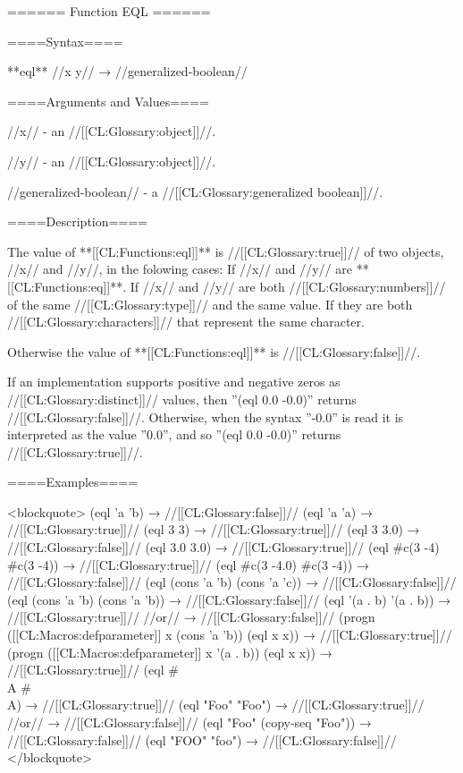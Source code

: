 ====== Function EQL ======

====Syntax====

**eql** //x y// → //generalized-boolean//

====Arguments and Values====

//x// - an //[[CL:Glossary:object]]//.

//y// - an //[[CL:Glossary:object]]//.

//generalized-boolean// - a //[[CL:Glossary:generalized boolean]]//.

====Description====

The value of **[[CL:Functions:eql]]** is //[[CL:Glossary:true]]// of two objects, //x// and //y//, in the folowing cases: \beginlist {} If //x// and //y// are **[[CL:Functions:eq]]**.  If //x// and //y// are both //[[CL:Glossary:numbers]]// of the same //[[CL:Glossary:type]]// and the same value.  If they are both //[[CL:Glossary:characters]]// that represent the same character. \endlist

Otherwise the value of **[[CL:Functions:eql]]** is //[[CL:Glossary:false]]//.

If an implementation supports positive and negative zeros as //[[CL:Glossary:distinct]]// values, then ''(eql 0.0 -0.0)'' returns //[[CL:Glossary:false]]//. Otherwise, when the syntax ''-0.0'' is read it is interpreted as the value ''0.0'', and so ''(eql 0.0 -0.0)'' returns //[[CL:Glossary:true]]//.

====Examples====

<blockquote> (eql 'a 'b) → //[[CL:Glossary:false]]// (eql 'a 'a) → //[[CL:Glossary:true]]// (eql 3 3) → //[[CL:Glossary:true]]// (eql 3 3.0) → //[[CL:Glossary:false]]// (eql 3.0 3.0) → //[[CL:Glossary:true]]// (eql #c(3 -4) #c(3 -4)) → //[[CL:Glossary:true]]// (eql #c(3 -4.0) #c(3 -4)) → //[[CL:Glossary:false]]// (eql (cons 'a 'b) (cons 'a 'c)) → //[[CL:Glossary:false]]// (eql (cons 'a 'b) (cons 'a 'b)) → //[[CL:Glossary:false]]// (eql '(a . b) '(a . b)) → //[[CL:Glossary:true]]// //or// → //[[CL:Glossary:false]]// (progn ([[CL:Macros:defparameter]] x (cons 'a 'b)) (eql x x)) → //[[CL:Glossary:true]]// (progn ([[CL:Macros:defparameter]] x '(a . b)) (eql x x)) → //[[CL:Glossary:true]]// (eql #\\A #\\A) → //[[CL:Glossary:true]]// (eql "Foo" "Foo") → //[[CL:Glossary:true]]// //or// → //[[CL:Glossary:false]]// (eql "Foo" (copy-seq "Foo")) → //[[CL:Glossary:false]]// (eql "FOO" "foo") → //[[CL:Glossary:false]]// </blockquote>

